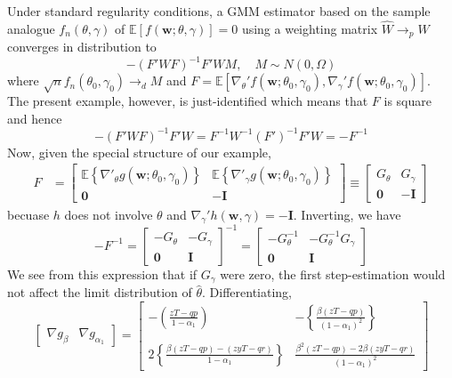 \documentclass[12pt]{article}
\begin{document}
Under standard regularity conditions, a GMM estimator based on the sample analogue $f_n(\theta, \gamma)$ of $\mathbb{E}[f(\mathbf{w};\theta,\gamma)]=0$ using a weighting matrix $\widehat{W}\rightarrow_p W$ converges in distribution to
\[
  -(F'WF)^{-1}F'W M, \quad M\sim N(0, \Omega) 
\]
where $\sqrt{n}f_n(\theta_0, \gamma_0) \rightarrow_d M$ and $F = \mathbb{E}[\nabla_\theta' f(\mathbf{w};\theta_0, \gamma_0), \nabla_\gamma' f(\mathbf{w}; \theta_0, \gamma_0)]$.
The present example, however, is just-identified which means that $F$ is square and hence
\[
  -(F'WF)^{-1}F'W = F^{-1}W^{-1}(F')^{-1}F'W = -F^{-1}
\]
Now, given the special structure of our example,
\begin{align*}
  F &= \left[
    \begin{array}{cc}
      \mathbb{E}\left\{\nabla'_\theta g(\mathbf{w};\theta_0, \gamma_0)\right\} & 
      \mathbb{E}\left\{\nabla'_\gamma g(\mathbf{w};\theta_0, \gamma_0)\right\}\\
\mathbf{0}& -\mathbf{I}
    \end{array}
  \right] \equiv
  \left[
  \begin{array}{cc}
    G_\theta & G_\gamma\\
    \mathbf{0} & - \mathbf{I}
  \end{array}
\right]
\end{align*}
becuase $h$ does not involve $\theta$ and $\nabla_\gamma' h(\mathbf{w},\gamma) = -\mathbf{I}$.
Inverting, we have
\[
  -F^{-1} = 
  \left[
  \begin{array}{cc}
    -G_\theta & -G_\gamma \\
    \mathbf{0} & \mathbf{I}
  \end{array}
\right]^{-1} =
\left[
\begin{array}{cc}
  -G_{\theta}^{-1} & -G_{\theta}^{-1}G_{\gamma}\\
  \mathbf{0} & \mathbf{I}
\end{array}
\right]
\]
We see from this expression that if $G_\gamma$ were zero, the first step-estimation would not affect the limit distribution of $\widehat{\theta}$.
Differentiating,
\[ 
  \left[
  \begin{array}{cc}
    \nabla g_\beta & \nabla g_{\alpha_1}
  \end{array}
\right] = 
  \left[
  \begin{array}{cc}
    \displaystyle -\left(\frac{zT - qp}{1 - \alpha_1}\right) & \displaystyle -\left\{\frac{\beta(zT - qp)}{(1 - \alpha_1)^2}\right\} \\ \\
    \displaystyle 2\left\{ \frac{\beta(zT - qp) - (zyT - qr)}{1 - \alpha_1}\right\} & \displaystyle \frac{\beta^2(zT - qp) - 2\beta (zyT - qr)}{(1 - \alpha_1)^2}
  \end{array}
\right]
\]
\end{document}
